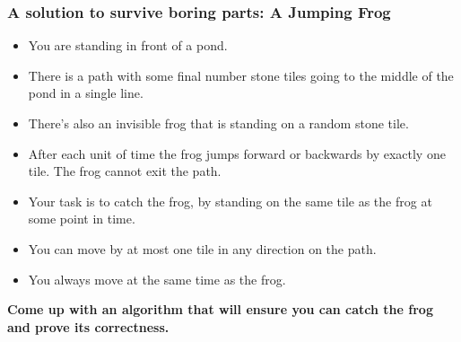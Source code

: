 \documentclass{beamer}
\begin{document}
\begin{frame}
  \frametitle{A solution to survive boring parts: A Jumping Frog}

  \begin{itemize}
    \item You are standing in front of a pond.
    \item There is a path with some final number stone tiles going to the middle of the pond in a single line.
    \item There's also an invisible frog that is standing on a random stone tile.
    \item After each unit of time the frog jumps forward or backwards by exactly one tile. The frog cannot exit the path.
    \item Your task is to catch the frog, by standing on the same tile as the frog at some point in time.
    \item You can move by at most one tile in any direction on the path.
    \item You always move at the same time as the frog.
  \end{itemize}

  \textbf{
  Come up with an algorithm that will ensure you can catch the frog and prove its correctness.
  }

\end{frame}

\end{document}
